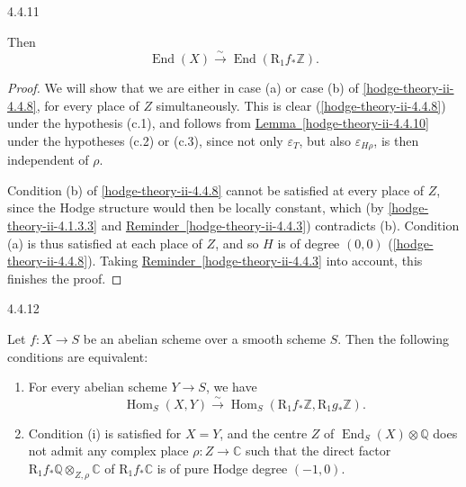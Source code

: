 \begin{proposition}{4.4.11}
\begin{enumerate}
\begin{enumerate}
        \end{enumerate}

      

    \end{enumerate}\par{}Then
    \[       \operatorname {End}(X)       \xrightarrow {\sim } \operatorname {End}(\mathrm {R}_1f_*\mathbb {Z}).     \]\begin{proof}\par{}We will show that we are either in case (a) or case (b) of \cref{hodge-theory-ii-4.4.8}, for every place of \(Z\) simultaneously.
      This is clear (\cref{hodge-theory-ii-4.4.8}) under the hypothesis (c.1), and follows from \hyperref[hodge-theory-ii-4.4.10]{Lemma~\ref*{hodge-theory-ii-4.4.10}} under the hypotheses (c.2) or (c.3), since not only \(\varepsilon _T\), but also \(\varepsilon _{H\rho }\), is then independent of \(\rho \).\par{}Condition (b) of \cref{hodge-theory-ii-4.4.8} cannot be satisfied at every place of \(Z\), since the Hodge structure would then be locally constant, which (by \cref{hodge-theory-ii-4.1.3.3} and \hyperref[hodge-theory-ii-4.4.3]{Reminder~\ref*{hodge-theory-ii-4.4.3}}) contradicts (b).
      Condition (a) is thus satisfied at each place of \(Z\), and so \(H\) is of degree \((0,0)\) (\cref{hodge-theory-ii-4.4.8}).
      Taking \hyperref[hodge-theory-ii-4.4.3]{Reminder~\ref*{hodge-theory-ii-4.4.3}} into account, this finishes the proof.\end{proof}\end{proposition}\begin{proposition}{4.4.12}\label{hodge-theory-ii-4.4.12}\skipsinglepar\par{}Let \(f\colon  X\to  S\) be an abelian scheme over a smooth scheme \(S\).
    Then the following conditions are equivalent:

    
 \begin{enumerate}
      
 \item[(i)]
        For every abelian scheme \(Y\to  S\), we have
        \[           \operatorname {Hom}_S(X,Y)           \xrightarrow {\sim } \operatorname {Hom}_S(\mathrm {R}_1f_*\mathbb {Z},\mathrm {R}_1g_*\mathbb {Z}).         \]
      

      
 \item[(ii)]
        Condition (i) is satisfied for \(X=Y\), and the centre \(Z\) of \(\operatorname {End}_S(X)\otimes \mathbb {Q}\) does not admit any complex place \(\rho \colon  Z\to \mathbb {C}\) such that the direct factor \(\mathrm {R}_1f_*\mathbb {Q}\otimes _{Z,\rho }\mathbb {C}\) of \(\mathrm {R}_1f_*\mathbb {C}\) is of pure Hodge degree \((-1,0)\).
      


\end{enumerate}
\end{proposition}
